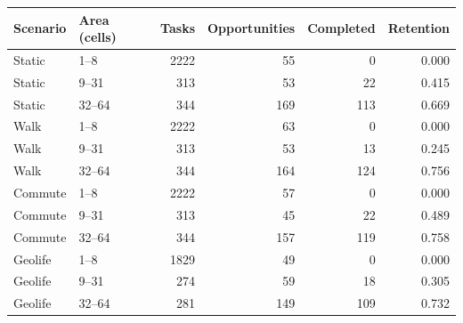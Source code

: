 \begin{tabular}{llrrrr}
\toprule
Scenario & Area (cells) & Tasks & Opportunities & Completed & Retention \\
\midrule
Static & 1--8 & 2222 & 55 & 0 & 0.000 \\
Static & 9--31 & 313 & 53 & 22 & 0.415 \\
Static & 32--64 & 344 & 169 & 113 & 0.669 \\
Walk & 1--8 & 2222 & 63 & 0 & 0.000 \\
Walk & 9--31 & 313 & 53 & 13 & 0.245 \\
Walk & 32--64 & 344 & 164 & 124 & 0.756 \\
Commute & 1--8 & 2222 & 57 & 0 & 0.000 \\
Commute & 9--31 & 313 & 45 & 22 & 0.489 \\
Commute & 32--64 & 344 & 157 & 119 & 0.758 \\
Geolife & 1--8 & 1829 & 49 & 0 & 0.000 \\
Geolife & 9--31 & 274 & 59 & 18 & 0.305 \\
Geolife & 32--64 & 281 & 149 & 109 & 0.732 \\
\bottomrule
\end{tabular}
